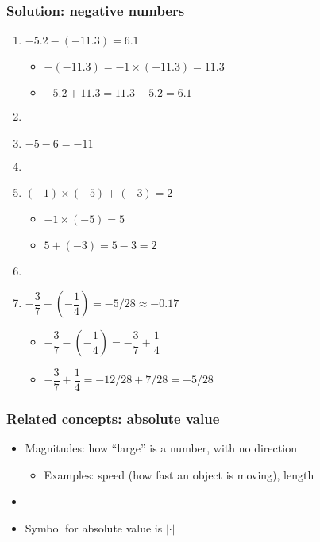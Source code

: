 \documentclass[11pt,dvipsnames]{beamer}
\newcommand{\myframe}[1]{\begin{frame} \frametitle{#1}}
\begin{document}
\myframe{Solution: negative numbers}
\begin{enumerate}
\item $-5.2 - (-11.3) = 6.1$ \pause
\begin{itemize}
\item $-(-11.3) = -1 \times (-11.3) = 11.3$ \pause
\item $-5.2 + 11.3 = 11.3 - 5.2 = 6.1$
\end{itemize}
\item[] \pause
\item $-5 - 6 = -11$
\item[] \pause
\item $(-1)\times(-5) + (-3) = 2$ \pause
\begin{itemize}
\item $-1 \times (-5) = 5$ \pause
\item $5 + (-3) = 5 - 3 = 2$
\end{itemize}
\item[] \pause
\item $-\dfrac{3}{7} - \left(-\dfrac{1}{4}\right) = -5/28 \approx -0.17$ \pause
\begin{itemize}
\item $-\dfrac{3}{7} - \left(-\dfrac{1}{4}\right) = -\dfrac{3}{7} + \dfrac{1}{4}$ \pause
\item $-\dfrac{3}{7} + \dfrac{1}{4} = -12/28 + 7/28 = -5/28$
\end{itemize}
\end{enumerate}
\end{frame}

\myframe{Related concepts: absolute value}
\begin{itemize}
\item Magnitudes: how ``large'' is a number, with no direction
\begin{itemize}
\item Examples: speed (how fast an object is moving), length 
\end{itemize}
\item[] \pause
\item Symbol for absolute value is $|\cdot |$
\end{itemize}
\centering
{}
\end{frame}
\end{document}
